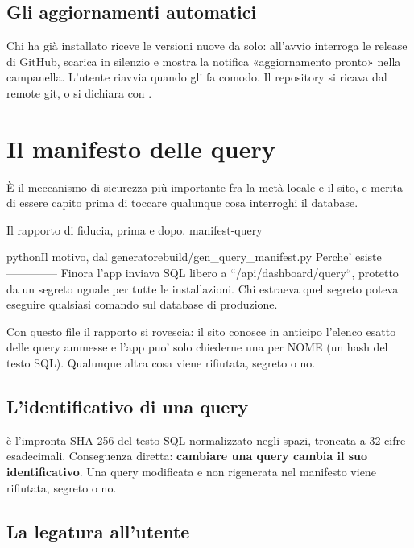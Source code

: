 \subsection{Gli aggiornamenti automatici}

Chi ha già installato riceve le versioni nuove da solo: all'avvio
 interroga le release di GitHub, scarica in silenzio e
mostra la notifica «aggiornamento pronto» nella campanella. L'utente riavvia
quando gli fa comodo. Il repository si ricava dal remote git, o si dichiara
con .

\section{Il manifesto delle query}\label{sez:manifesto}

È il meccanismo di sicurezza più importante fra la metà locale e il sito, e
merita di essere capito prima di toccare qualunque cosa interroghi il
database.

  {Il rapporto di fiducia, prima e dopo.}
  {manifest-query}

\begin{codiceInterno}{python}{Il motivo, dal generatore}{build/gen\_query\_manifest.py}
Perche' esiste
--------------
Finora l'app inviava SQL libero a ``/api/dashboard/query``, protetto da un
segreto uguale per tutte le installazioni. Chi estraeva quel segreto poteva
eseguire qualsiasi comando sul database di produzione.

Con questo file il rapporto si rovescia: il sito conosce in anticipo l'elenco
esatto delle query ammesse e l'app puo' solo chiederne una per NOME (un hash
del testo SQL). Qualunque altra cosa viene rifiutata, segreto o no.
\end{codiceInterno}

\subsection{L'identificativo di una query}

 è l'impronta SHA-256 del testo SQL normalizzato negli spazi,
troncata a \num{32} cifre esadecimali. Conseguenza diretta: \textbf{cambiare
una query cambia il suo identificativo}. Una query modificata e non
rigenerata nel manifesto viene rifiutata, segreto o no.

\subsection{La legatura all'utente}

